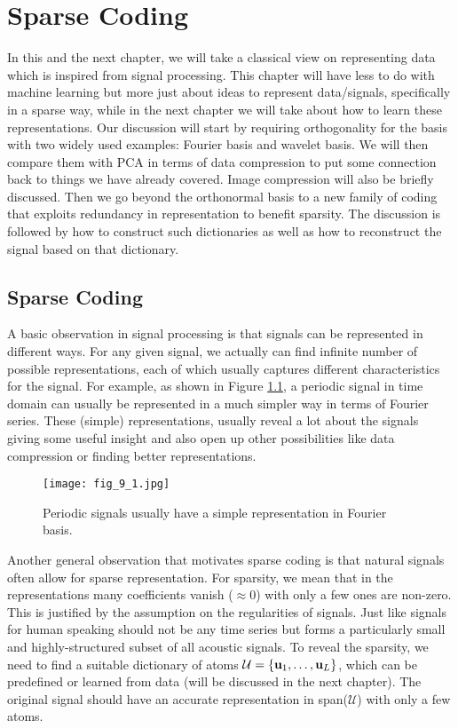 \documentclass[../main.tex]{subfiles}
\begin{document}

\chapter{Sparse Coding}
In this and the next chapter, we will take a classical view on representing data which is inspired from signal processing. This chapter will have less to do with machine learning but more just about ideas to represent data/signals, specifically in a sparse way, while in the next chapter we will take about how to learn these representations. Our discussion will start by requiring orthogonality for the basis with two widely used examples: Fourier basis and wavelet basis. We will then compare them with PCA in terms of data compression to put some connection back to things we have already covered. Image compression will also be briefly discussed. Then we go beyond the orthonormal basis to a new family of coding that exploits redundancy in representation to benefit sparsity. The discussion is followed by how to construct such dictionaries as well as how to reconstruct the signal based on that dictionary.
\section{Sparse Coding}
A basic observation in signal processing is that signals can be represented in different ways. For any given signal, we actually can find infinite number of possible representations, each of which usually captures different characteristics for the signal. For example, as shown in Figure \ref{fig_9_1}, a periodic signal in time domain can usually be represented in a much simpler way in terms of Fourier series. These (simple) representations, usually reveal a lot about the signals giving some useful insight and also open up other possibilities like data compression or finding better representations. 
\begin{figure}[h] 
	\centering 
	\texttt{[image: fig\_9\_1.jpg]} 
	\caption{Periodic signals usually have a simple representation in Fourier basis.}\label{fig_9_1}
\end{figure}
\par Another general observation that motivates sparse coding is that natural signals often allow for sparse representation. For sparsity, we mean that in the representations many coefficients vanish ($\approx 0$) with only a few ones are non-zero. This is justified by the assumption on the regularities of signals. Just like signals for human speaking should not be any time series but forms a particularly small and highly-structured subset of all acoustic signals. To reveal the sparsity, we need to find a suitable dictionary of atoms $\mathcal{U}=\{{\bf u}_1,\dots,{\bf u}_L\}$, which can be predefined or learned from data (will be discussed in the next chapter). The original signal should have an accurate representation in span($\mathcal{U}$) with only a few atoms.
\end{document}
